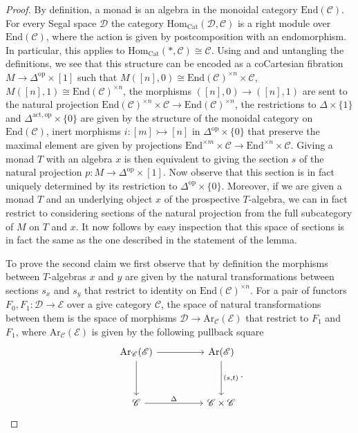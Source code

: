 \documentclass[a4paper, reqno]{amsart}
\theoremstyle{definition}
\newcommand\cC{\mathscr C}
\newcommand\cD{\mathscr D}
\newcommand\cE{\mathscr E}
\newcommand\edm{\mathrm{End}}
\newcommand\mor{\mathrm{Hom}}
\newcommand\op{\mathrm{op}}
\newcommand\cat{\mathrm{Cat}}
\newcommand\arr{\mathrm{Ar}}
\newcommand\act{\mathrm{act}}
\begin{document}
\begin{proof}
By definition, a monad is an algebra in the monoidal category $\edm(\cC)$. For every Segal space $\cD$ the category $\mor_\cat(\cD,\cC)$ is a right module over $\edm(\cC)$, where the action is given by postcomposition with an endomorphism. In particular, this applies to $\mor_\cat(*,\cC)\cong\cC$. Using \cite[Proposition 4.2.2.9.]{luriehigher} and \cite[4.2.2.12.]{luriehigher} and untangling the definitions, we see that this structure can be encoded as a coCartesian fibration $M\rightarrow\Delta^\op\times[1]$ such that $M([n],0)\cong\edm(\cC)^{\times n}\times \cC$, $M([n],1)\cong \edm(\cC)^{\times n}$, the morphisms $([n],0)\rightarrow([n],1)$ are sent to the natural projection $\edm(\cC)^{\times n}\times \cC\rightarrow\edm(\cC)^{\times n}$, the restrictions to $\Delta\times\{1\}$ and $\Delta^{\act,\op}\times\{0\}$ are given by the structure of the monoidal category on $\edm(\cC)$, inert morphisms $i:[m]\rightarrowtail[n]$ in $\Delta^{\op}\times\{0\}$ that preserve the maximal element are given by projections $\edm^{\times m}\times\cC\rightarrow\edm^{\times n}\times \cC$. Giving a monad $T$ with an algebra $x$ is then equivalent to giving the section $s$ of the natural projection $p:M\rightarrow\Delta^\op\times[1]$. Now observe that this section is in fact uniquely determined by its restriction to $\Delta^\op\times\{0\}$. Moreover, if we are given a monad $T$ and an underlying object $x$ of the prospective $T$-algebra, we can in fact restrict to considering sections of the natural projection from the full subcategory of $M$ on $T$ and $x$. It now follows by easy inspection that this space of sections is in fact the same as the one described in the statement of the lemma.\par
To prove the second claim we first observe that by definition the morphisms between $T$-algebras $x$ and $y$ are given by the natural transformations between sections $s_x$ and $s_y$ that restrict to identity on $\edm(\cC)^{\times n}$. For a pair of functors $F_0,F_1:\cD\rightarrow\cE$ over a give category $\cC$, the space of natural transformations between them is the space of morphisms $\cD\rightarrow\arr_\cC(\cE)$ that restrict to $F_1$ and $F_1$, where $\arr_\cC(\cE)$ is given by the following pullback square
\[
\begin{tikzcd}[row sep=huge, column sep=huge]
{\arr_\cC(\cE)}\arrow[d]\arrow[r]&{\arr(\cE)}\arrow[d, "(s{,}t)"]\\
\cC\arrow[r, "\Delta"]&\cC\times\cC
\end{tikzcd}.
\]
\end{proof}
\end{document}
